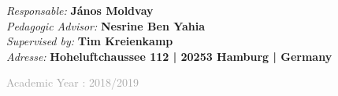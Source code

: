 \begin{center}
  \emph{Responsable:}\textbf{ János Moldvay}\\ [0.4cm]
\emph{Pedagogic Advisor:}\textbf{ Nesrine Ben Yahia }\\[0.4cm]
\emph{Supervised by:}\textbf{ Tim Kreienkamp}\\[0.4cm]
\emph{Adresse:}\textbf{ Hoheluftchaussee 112 | 20253 Hamburg | Germany} \\[0.4cm]




\bigskip
\bigskip
\bigskip
\bigskip

\centerline{\large{\textcolor{darkgray}{{  Academic Year : 2018/2019}}}}
\end{center}





